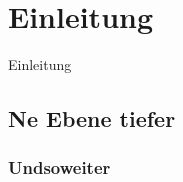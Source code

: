 \section{Einleitung}
\label{sec:einleitung}
Einleitung

\subsection{Ne Ebene tiefer}

\subsubsection{Undsoweiter}